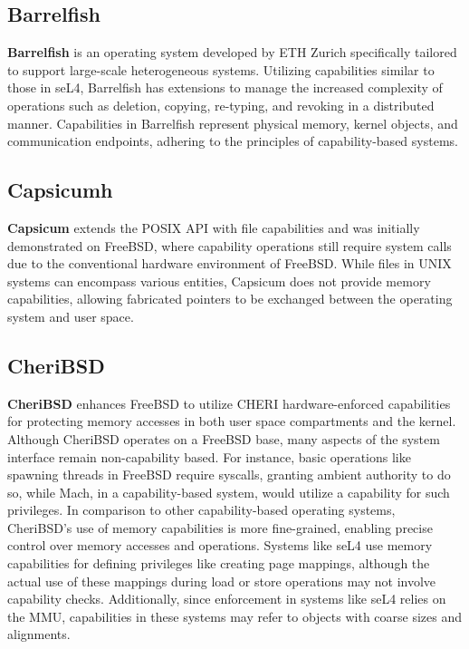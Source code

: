 \subsection{Barrelfish}
\textbf{Barrelfish}\cite{baumann_multikernel_2009} is an operating system developed by ETH Zurich specifically tailored to support large-scale heterogeneous systems. Utilizing capabilities 
similar to those in seL4, Barrelfish has extensions to manage the increased complexity of operations such as deletion, copying, re-typing, 
and revoking in a distributed manner. Capabilities in Barrelfish represent physical memory, kernel objects, and communication 
endpoints, adhering to the principles of capability-based systems.
\newline

\subsection{Capsicumh}
\textbf{Capsicum}\cite{watson_capsicum_nodate} extends the POSIX API with file capabilities and was initially demonstrated on FreeBSD, where capability operations still require 
system calls due to the conventional hardware environment of FreeBSD. While files in UNIX systems can encompass various entities, 
Capsicum does not provide memory capabilities, allowing fabricated pointers to be exchanged between the operating system and user space.
\newline

\subsection{CheriBSD}
\textbf{CheriBSD}\cite{noauthor_getting_nodate} enhances FreeBSD to utilize CHERI hardware-enforced capabilities for protecting memory accesses in both user space compartments 
and the kernel. Although CheriBSD operates on a FreeBSD base, many aspects of the system interface remain non-capability based. For instance, 
basic operations like spawning threads in FreeBSD require syscalls, granting ambient authority to do so, while Mach, in a capability-based system, 
would utilize a capability for such privileges. In comparison to other capability-based operating systems, CheriBSD's use of memory capabilities 
is more fine-grained, enabling precise control over memory accesses and operations. Systems like seL4 use memory capabilities for defining privileges 
like creating page mappings, although the actual use of these mappings during load or store operations may not involve capability checks. Additionally, 
since enforcement in systems like seL4 relies on the MMU, capabilities in these systems may refer to objects with coarse sizes and alignments.

